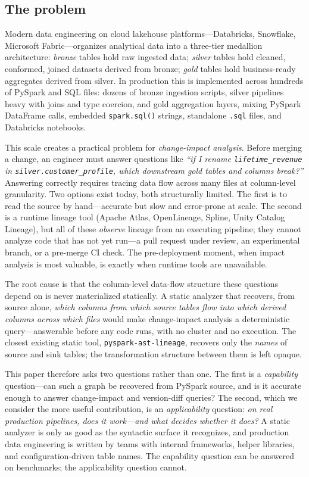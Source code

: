 \documentclass[11pt]{article}
\newcommand{\code}[1]{\texttt{#1}}
\begin{document}
\subsection{The problem}
Modern data engineering on cloud lakehouse platforms---Databricks, Snowflake,
Microsoft Fabric---organizes analytical data into a three-tier medallion
architecture: \emph{bronze} tables hold raw ingested data; \emph{silver} tables
hold cleaned, conformed, joined datasets derived from bronze; \emph{gold} tables
hold business-ready aggregates derived from silver. In production this is
implemented across hundreds of PySpark and SQL files: dozens of bronze ingestion
scripts, silver pipelines heavy with joins and type coercion, and gold aggregation
layers, mixing PySpark DataFrame calls, embedded \code{spark.sql()} strings,
standalone \code{.sql} files, and Databricks notebooks.

This scale creates a practical problem for \emph{change-impact analysis}. Before
merging a change, an engineer must answer questions like \emph{``if I rename
\code{lifetime_revenue} in \code{silver.\allowbreak customer_profile}, which downstream gold
tables and columns break?''} Answering correctly requires tracing data flow across
many files at column-level granularity. Two options exist today, both structurally
limited. The first is to read the source by hand---accurate but slow and
error-prone at scale. The second is a runtime lineage tool (Apache Atlas,
OpenLineage, Spline, Unity Catalog Lineage), but all of these \emph{observe}
lineage from an executing pipeline; they cannot analyze code that has not yet
run---a pull request under review, an experimental branch, or a pre-merge CI check.
The pre-deployment moment, when impact analysis is most valuable, is exactly when
runtime tools are unavailable.

The root cause is that the column-level data-flow structure these questions depend
on is never materialized statically. A static analyzer that recovers, from source
alone, \emph{which columns from which source tables flow into which derived columns
across which files} would make change-impact analysis a deterministic
query---answerable before any code runs, with no cluster and no execution. The
closest existing static tool, \code{pyspark-ast-lineage}, recovers only the
\emph{names} of source and sink tables; the transformation structure
between them is left opaque.

This paper therefore asks two questions rather than one. The first is a
\emph{capability} question---can such a graph be recovered from PySpark source, and
is it accurate enough to answer change-impact and version-diff queries? The second,
which we consider the more useful contribution, is an \emph{applicability} question:
\emph{on real production pipelines, does it work---and what decides whether it
does?} A static analyzer is only as good as the syntactic surface it recognizes, and
production data engineering is written by teams with internal frameworks, helper
libraries, and configuration-driven table names. The capability question can be
answered on benchmarks; the applicability question cannot.
\end{document}
